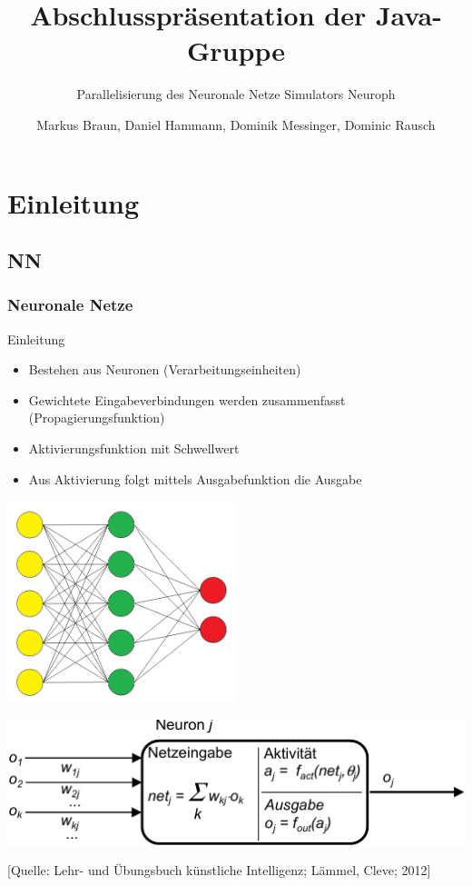 \documentclass[18pt]{beamer}
\title{Abschlusspräsentation der Java-Gruppe}
\subtitle{Parallelisierung des Neuronale Netze Simulators Neuroph}
\author{Markus Braun, Daniel Hammann, Dominik Messinger, Dominic Rausch}
\institute{Institut für Programmstrukturen und Datenorganisation (IPD), Lehrstuhl für Programmiersysteme}
\begin{document}
	\maketitle
	
	\section{Einleitung}
	\subsection{NN}
	\begin{frame}[c]\frametitle{Neuronale Netze}
		\begin{block}{Einleitung}
		    \begin{itemize}
			    \item Bestehen aus Neuronen (Verarbeitungseinheiten)
		    	\item Gewichtete Eingabeverbindungen werden zusammenfasst (Propagierungsfunktion)
		    	\item Aktivierungsfunktion mit Schwellwert
		    	\item Aus Aktivierung folgt mittels Ausgabefunktion die Ausgabe
		    \end{itemize}		    
		\end{block}	
		\vspace{.5cm}
		\begin{minipage}[c]{0.48\textwidth}
			\begin{center}
			\includegraphics[width=0.5\textwidth]{images/ann.png}
			\end{center}
		\end{minipage}	
		\begin{minipage}[c]{0.48\textwidth}
			\begin{center}
			\includegraphics[width=\textwidth]{images/Neuron}
			\end{center}				
		\end{minipage}
		\begin{flushright}
			\tiny{[Quelle: Lehr- und Übungsbuch künstliche Intelligenz; Lämmel, Cleve; 2012]}
		\end{flushright}
	\end{frame}
\end{document}
